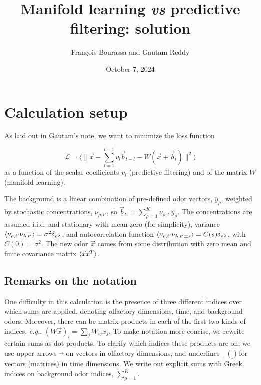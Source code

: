 \documentclass[letter, 12pt]{article}
\def\beq{ \begin{equation} }		%
\def\eeq{ \end{equation} } 			%
\def\eg{\textit{e.g.}, }
\newcommand{\dul}[1]{\underline{\underline{#1}}}
\begin{document}
\title{Manifold learning \textit{vs} predictive filtering: solution}
\author{François Bourassa and Gautam Reddy}
\date{October 7, 2024}

\maketitle

\tableofcontents

\section{Calculation setup}
As laid out in Gautam's note, we want to minimize the loss function

\beq
	\mathcal{L} = \Big\langle{\Big\| \vec{x} - \sum_{l=1}^{t-1} v_l \vec{b}_{t-l} - W (\vec{x} + \vec{b}_t) \Big\|^2} \Big\rangle
	\label{eq:loss_def}
\eeq
 as a function of the scalar coefficients $v_l$ (predictive filtering) and of the matrix $W$ (manifold learning). 
 
 The background is a linear combination of pre-defined odor vectors, $\hat{y}_{\rho}$, weighted by stochastic concentrations,  $\nu_{\rho, t'}$, so $\vec{b}_{t'} = \sum_{\rho=1}^K \nu_{\rho, t'} \hat{y}_{\rho}$. The concentrations are assumed i.i.d. and stationary with mean zero (for simplicity), variance $\braket{\nu_{\rho, t'} \nu_{\lambda, t'}} = \sigma^2 \delta_{\rho \lambda}$, and autocorrelation function $\braket{\nu_{\rho, t'} \nu_{\lambda, t' \pm s}} = C(s) \delta_{\rho \lambda}$, with $C(0) = \sigma^2$. The new odor $\vec{x}$ comes from some distribution with zero mean and finite covariance matrix $\braket{\vec{x}\vec{x}^T}$. 
 
 
 \subsection{Remarks on the notation}
 One difficulty in this calculation is the presence of three different indices over which sums are applied, denoting olfactory dimensions, time, and background odors. Moreover, there can be matrix products in each of the first two kinds of indices, \eg $(W \vec{x})_i = \sum_{j} W_{ij} x_j$. To make notation more concise, we rewrite certain sums as dot products. To clarify which indices these products are on, we use upper arrows $\vec{\,\,\,}$ on vectors in olfactory dimensions, and underlines $\underline{\,\,\,}$ ($\dul{\,\,\,}$) for \underline{vectors} (\dul{matrices}) in time dimensions. We write out explicit sums with Greek indices on background odor indices, $\sum_{\rho=1}^K$. 
 
\end{document}
